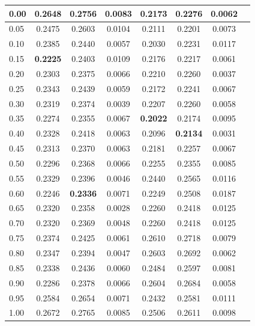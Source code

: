 \begin{singlespacing}
\begin{center}
\begin{threeparttable}
\begin{small}
\begin{tabular}{|l|c|c|c|c|c|c|c|}
        \hline
            0.00  & 0.2648 & 0.2756 & 0.0083   &  0.2173 & 0.2276 & 0.0062 \\
        \hline
            0.05  & 0.2475 & 0.2603 & 0.0104   &  0.2111 & 0.2201 & 0.0073 \\
        \hline
            0.10  & 0.2385 & 0.2440 & 0.0057   &  0.2030 & 0.2231 & 0.0117 \\
        \hline
            0.15  & \textbf{0.2225} & 0.2403 & 0.0109   &  0.2176 & 0.2217 & 0.0061 \\
        \hline
            0.20  & 0.2303 & 0.2375 & 0.0066   &  0.2210 & 0.2260 & 0.0037 \\
        \hline
            0.25  & 0.2343 & 0.2439 & 0.0059   &  0.2172 & 0.2241 & 0.0067 \\
        \hline
            0.30  & 0.2319 & 0.2374 & 0.0039   &  0.2207 & 0.2260 & 0.0058 \\
        \hline
            0.35  & 0.2274 & 0.2355 & 0.0067   &  \textbf{0.2022} & 0.2174 & 0.0095 \\
        \hline
            0.40  & 0.2328 & 0.2418 & 0.0063   &  0.2096 & \textbf{0.2134} & 0.0031 \\
        \hline
            0.45  & 0.2313 & 0.2370 & 0.0063   &  0.2181 & 0.2257 & 0.0067 \\
        \hline
            0.50  & 0.2296 & 0.2368 & 0.0066   &  0.2255 & 0.2355 & 0.0085 \\
        \hline
            0.55  & 0.2329 & 0.2396 & 0.0046   &  0.2440 & 0.2565 & 0.0116 \\
        \hline
            0.60  & 0.2246 & \textbf{0.2336} & 0.0071   &  0.2249 & 0.2508 & 0.0187 \\
        \hline
            0.65  & 0.2320 & 0.2358 & 0.0028   &  0.2260 & 0.2418 & 0.0125 \\
        \hline
            0.70  & 0.2320 & 0.2369 & 0.0048   &  0.2260 & 0.2418 & 0.0125 \\
        \hline
            0.75  & 0.2374 & 0.2425 & 0.0061   &  0.2610 & 0.2718 & 0.0079 \\
        \hline
            0.80  & 0.2347 & 0.2394 & 0.0047   &  0.2603 & 0.2692 & 0.0062 \\
        \hline
            0.85  & 0.2338 & 0.2436 & 0.0060   &  0.2484 & 0.2597 & 0.0081 \\
        \hline
            0.90  & 0.2286 & 0.2378 & 0.0066   &  0.2604 & 0.2684 & 0.0058 \\
        \hline
            0.95  & 0.2584 & 0.2654 & 0.0071   &  0.2432 & 0.2581 & 0.0111 \\
        \hline
            1.00  & 0.2672 & 0.2765 & 0.0085   &  0.2506 & 0.2611 & 0.0098 \\
        \hline
        \end{tabular}
    \end{small}
    \end{threeparttable}
    \end{center}
    \end{singlespacing}

